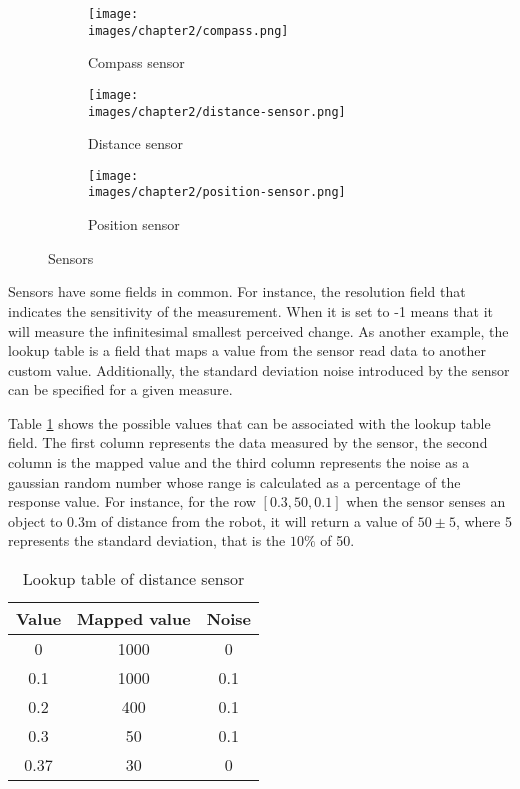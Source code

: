 \begin{figure}[h!]
  \centering
  \begin{subfigure}[b]{0.3\linewidth}
  	\texttt{[image: \\images/chapter2/compass.png]}
  	\caption{Compass sensor}
  	\label{fig:ch-2:compass}
  \end{subfigure}
  \vspace{0.00mm}
  \begin{subfigure}[b]{0.3\linewidth}
  	\texttt{[image: \\images/chapter2/distance-sensor.png]}
  	\caption{Distance sensor}
  	\label{fig:ch-2:distance-sensor}
  \end{subfigure}
  \vspace{0.00mm}
  \begin{subfigure}[b]{0.3\linewidth}
  	\texttt{[image: \\images/chapter2/position-sensor.png]}
  	\caption{Position sensor}
  	\label{fig:ch-2:position-sensor}
  \end{subfigure}
  \vspace{0.00mm}
  \caption{Sensors}
  \label{fig:ch-2:sensors}
\end{figure}

Sensors have some fields in common. For instance, the resolution field that indicates the sensitivity of the measurement. When it is set to -1 means that it will measure the infinitesimal smallest perceived change. As another example, the lookup table is a field that maps a value from the sensor read data to another custom value. Additionally, the standard deviation noise introduced by the sensor can be specified for a given measure. 

Table \ref{tab:ch-2:lookup} shows the possible values that can be associated with the lookup table field. The first column represents the data measured by the sensor, the second column is the mapped value and the third column represents the noise as a gaussian random number whose range is calculated as a percentage of the response value\cite{cyberbotics}. For instance, for the row $[0.3, 50, 0.1]$ when the sensor senses an object to 0.3m of distance from the robot, it will return a value of $50 \pm 5$, where 5 represents the standard deviation, that is the $10\%$ of 50.
\begin{table}[h!]
\centering
 \begin{tabular}{c c c} 
 \hline
 Value & Mapped value & Noise \\ [0.5ex] 
 \hline\hline
 0 & 1000 & 0 \\ 
 \hline
0.1 & 1000 & 0.1 \\ 
 \hline
 0.2 & 400 & 0.1 \\ 
 \hline
 0.3 & 50 & 0.1 \\ 
 \hline
 0.37 & 30 & 0 \\ 
 \hline
\end{tabular}
\caption{Lookup table of distance sensor}
\label{tab:ch-2:lookup}
\end{table}

